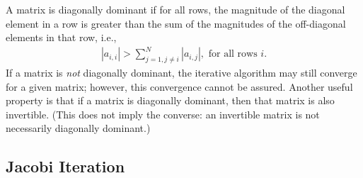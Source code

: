 A matrix is diagonally dominant if for all rows, the magnitude of the diagonal element in a row is greater than the sum of the magnitudes of the off-diagonal elements in that row, i.e.,
\begin{align}
  | a_{i,i} | > \sum_{j=1,j \ne i}^N |a_{i,j}|, \text{ for all rows $i$.}
\end{align}
If a matrix is \emph{not} diagonally dominant, the iterative algorithm may still converge for a given matrix; however, this convergence cannot be assured. Another useful property is that if a matrix is diagonally dominant, then that matrix is also invertible. (This does not imply the converse: an invertible matrix is not necessarily diagonally dominant.)

\subsection{Jacobi Iteration}

